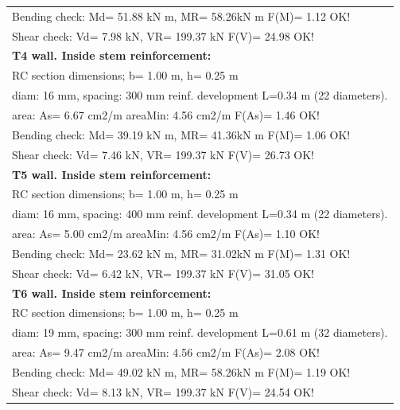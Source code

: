 \begin{center}
\begin{supertabular}{|l|}
  Bending check: Md=  51.88 kN m, MR=  58.26kN m  F(M)= 1.12 OK!\\
  Shear check: Vd=   7.98 kN,  VR= 199.37 kN  F(V)= 24.98 OK!\\
\hline
\textbf{T4 wall. Inside stem reinforcement:}\\
  RC section dimensions; b= 1.00 m, h= 0.25 m\\
  diam: 16 mm, spacing: 300 mm  reinf. development L=0.34 m (22 diameters).\\
  area: As=   6.67 cm2/m areaMin:   4.56 cm2/m  F(As)= 1.46 OK!\\
  Bending check: Md=  39.19 kN m, MR=  41.36kN m  F(M)= 1.06 OK!\\
  Shear check: Vd=   7.46 kN,  VR= 199.37 kN  F(V)= 26.73 OK!\\
\hline
\textbf{T5 wall. Inside stem reinforcement:}\\
  RC section dimensions; b= 1.00 m, h= 0.25 m\\
  diam: 16 mm, spacing: 400 mm  reinf. development L=0.34 m (22 diameters).\\
  area: As=   5.00 cm2/m areaMin:   4.56 cm2/m  F(As)= 1.10 OK!\\
  Bending check: Md=  23.62 kN m, MR=  31.02kN m  F(M)= 1.31 OK!\\
  Shear check: Vd=   6.42 kN,  VR= 199.37 kN  F(V)= 31.05 OK!\\
\hline
\textbf{T6 wall. Inside stem reinforcement:}\\
  RC section dimensions; b= 1.00 m, h= 0.25 m\\
  diam: 19 mm, spacing: 300 mm  reinf. development L=0.61 m (32 diameters).\\
  area: As=   9.47 cm2/m areaMin:   4.56 cm2/m  F(As)= 2.08 OK!\\
  Bending check: Md=  49.02 kN m, MR=  58.26kN m  F(M)= 1.19 OK!\\
  Shear check: Vd=   8.13 kN,  VR= 199.37 kN  F(V)= 24.54 OK!\\
\end{supertabular}
\end{center}

